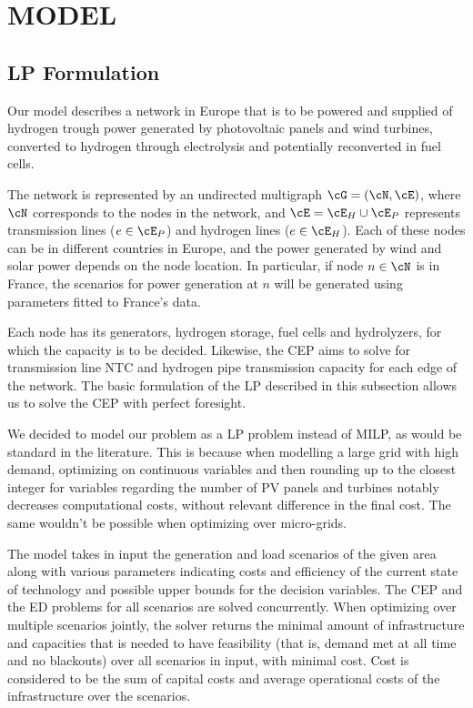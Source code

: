 \documentclass[smallextended,natbib]{svjour3}       %
\numberwithin{theorem}{section}
\begin{document}
\section{MODEL}\label{section: model}

\subsection{LP Formulation}\label{subsection: LP}
Our model describes a network in Europe that is to be powered and supplied of hydrogen trough power generated by photovoltaic panels and wind turbines, converted to hydrogen through electrolysis and potentially reconverted in fuel cells.

The network is represented by an undirected multigraph \(\cG = (\cN, \cE)\), where \(\cN\) corresponds to the nodes in the network, and \(\cE = \cE_H \cup \cE_P\) represents transmission lines (\(e \in \cE_P\)) and hydrogen lines (\(e \in \cE_H\)).
Each of these nodes can be in different countries in Europe, and the power generated by wind and solar power depends on the node location. 
In particular, if node \(n \in \cN\) is in France, the scenarios for power generation at \(n\) will be generated using parameters fitted to France's data.

Each node has its generators, hydrogen storage, fuel cells and hydrolyzers, for which the capacity is to be decided. 
Likewise, the CEP aims to solve for transmission line NTC and hydrogen pipe transmission capacity for each edge of the network. 
The basic formulation of the LP described in this subsection allows us to solve the CEP with perfect foresight. 

We decided to model our problem as a LP problem instead of MILP, as would be standard in the literature. 
This is because when modelling a large grid with high demand, optimizing on continuous variables and then rounding up to the closest integer for variables regarding the number of PV panels and turbines notably decreases computational costs, without relevant difference in the final cost. 
The same wouldn't be possible when optimizing over micro-grids.

The model takes in input the generation and load scenarios of the given area along with various parameters indicating costs and efficiency of the current state of technology and possible upper bounds for the decision variables. 
The CEP and the ED problems for all scenarios are solved concurrently. 
When optimizing over multiple scenarios jointly, the solver returns the minimal amount of infrastructure and capacities that is needed to have feasibility (that is, demand met at all time and no blackouts) over all scenarios in input, with minimal cost. 
Cost is considered to be the sum of capital costs and average operational costs of the infrastructure over the scenarios.
\end{document}
